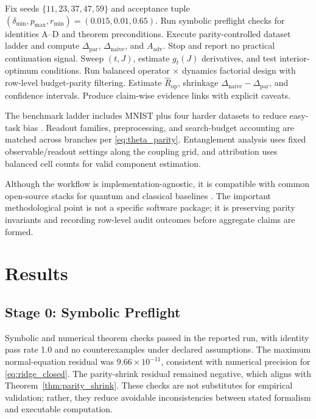 \documentclass{article} %
\begin{document}
\begin{algorithm}[t]
\caption{Hybrid Staged Validation Workflow}
\label{alg:staged_workflow}
\begin{algorithmic}
\STATE Fix seeds $\{11,23,37,47,59\}$ and acceptance tuple $(\delta_{\min},p_{\max},r_{\min})=(0.015,0.01,0.65)$.
\STATE Run symbolic preflight checks for identities A--D and theorem preconditions.
\STATE Execute parity-controlled dataset ladder and compute $\Delta_{\mathrm{par}}$, $\Delta_{\mathrm{naive}}$, and $A_{\mathrm{adv}}$.
    \STATE Stop and report no practical continuation signal.
\ELSE
    \STATE Sweep $(t,J)$, estimate $g_t(J)$ derivatives, and test interior-optimum conditions.
    \STATE Run balanced operator $\times$ dynamics factorial design with row-level budget-parity filtering.
    \STATE Estimate $\widehat{R}_{\mathrm{op}}$, shrinkage $\Delta_{\mathrm{naive}}-\Delta_{\mathrm{par}}$, and confidence intervals.
\ENDIF
\STATE Produce claim-wise evidence links with explicit caveats.
\end{algorithmic}
\end{algorithm}

The benchmark ladder includes MNIST plus four harder datasets to reduce easy-task bias \citep{xiao2017fashionmnist,cohen2017emnist,clanuwat2018kuzushiji,krizhevsky2009cifar}. Readout families, preprocessing, and search-budget accounting are matched across branches per \eqref{eq:theta_parity}. Entanglement analysis uses fixed observable/readout settings along the coupling grid, and attribution uses balanced cell counts for valid component estimation.

Although the workflow is implementation-agnostic, it is compatible with common open-source stacks for quantum and classical baselines \citep{kornjaca2024largescale,beaulieu2024robust}. The important methodological point is not a specific software package; it is preserving parity invariants and recording row-level audit outcomes before aggregate claims are formed.

\section{Results}
\label{sec:results}
\subsection{Stage 0: Symbolic Preflight}
Symbolic and numerical theorem checks passed in the reported run, with identity pass rate 1.0 and no counterexamples under declared assumptions. The maximum normal-equation residual was $9.66\times10^{-11}$, consistent with numerical precision for \eqref{eq:ridge_closed}. The parity-shrink residual remained negative, which aligns with Theorem~\ref{thm:parity_shrink}. These checks are not substitutes for empirical validation; rather, they reduce avoidable inconsistencies between stated formalism and executable computation.
\end{document}
